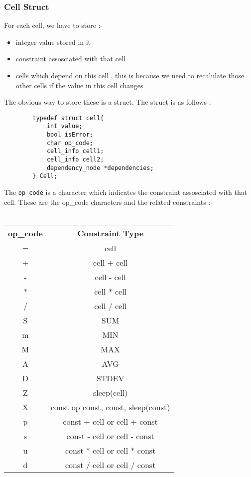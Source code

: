 \documentclass{article}
\begin{document}
\subsubsection{Cell Struct}
    For each cell, we have to store :-
    \begin{itemize}
        \item integer value stored in it
        \item constraint assosciated with that cell
        \item cells which depend on this cell , this is because we need to recalulate those other cells if the value in this cell changes
    \end{itemize}
    The obvious way to store these is a struct.
    The struct is as follows :
    \begin{verbatim}
        typedef struct cell{
            int value;
            bool isError;
            char op_code;
            cell_info cell1;
            cell_info cell2;
            dependency_node *dependencies;
        } Cell;
    \end{verbatim}
    The \texttt{op\_code} is a character which indicates the constraint assosciated with that cell. These are the op\_code characters and the related constraints :-
    \\\\
    \begin{tabular}{|c|c|}
        \hline
        op\_code & Constraint Type \\ 
        \hline
        =  & cell \\ 
        +  & cell + cell \\ 
        -  & cell - cell \\ 
        {*}  & cell {*} cell \\ 
        /  & cell / cell \\ 
        S  & SUM \\ 
        m  & MIN \\ 
        M  & MAX \\ 
        A  & AVG \\ 
        D  & STDEV \\ 
        Z  & sleep(cell) \\ 
        X  & const op const, const, sleep(const) \\ 
        p  & const + cell or cell + const \\ 
        s  & const - cell or cell - const \\ 
        u  & const * cell or cell * const \\ 
        d  & const / cell or cell / const \\ 
        \hline
    \end{tabular}
\end{document}
